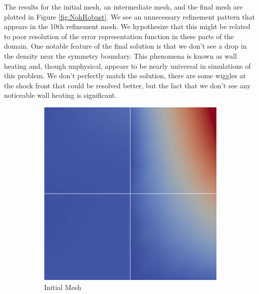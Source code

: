 \documentclass[Dissertation.tex]{subfiles}
\begin{document}
The results for the initial mesh, an intermediate mesh, and the final mesh are plotted 
in Figure \ref{fig:NohRobust}. 
We see an unnecessary refinement pattern that appears in the 10th refinement mesh.
We hypothesize that this might be related to poor resolution of the error representation function
in these parts of the domain.
One notable feature of the final solution is that we don't see a drop in the density near the symmetry boundary.
This phenomena is known as wall heating and, though unphysical, appears to be nearly 
universal in simulations of this problem.
We don't perfectly match the solution, there are some wiggles at the shock front that could be resolved
better, but the fact that we don't see any noticeable wall heating is significant.


\begin{figure}[!ht]
\centering
\begin{subfigure}[t]{0.32\textwidth}
\centering
\includegraphics[width=\textwidth]{Dissertation/Noh/Robust-mesh0.png}
\caption{Initial Mesh}
\end{subfigure}
\begin{subfigure}[t]{0.32\textwidth}
\centering

\end{subfigure}
\end{figure}
\end{document}

